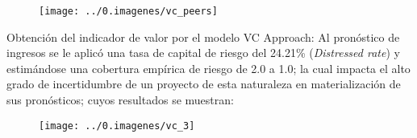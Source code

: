 \begin{figure}[H]
\centering
\texttt{[image: ../0.imagenes/vc\_peers]}
\end{figure}

\textcolor{principal}{Obtenci\'on del indicador de valor por el modelo VC Approach:}  Al pron\'ostico de ingresos se le aplic\'o una tasa de capital de riesgo del 24.21\% (\textit{Distressed rate}) y estim\'andose una cobertura emp\'irica de riesgo de 2.0 a 1.0; la cual impacta el alto grado de incertidumbre de un proyecto de esta naturaleza en materializaci\'on de sus pron\'osticos; cuyos resultados se muestran:\\

\begin{figure}[H]
\centering
\texttt{[image: ../0.imagenes/vc\_3]}
\end{figure}





